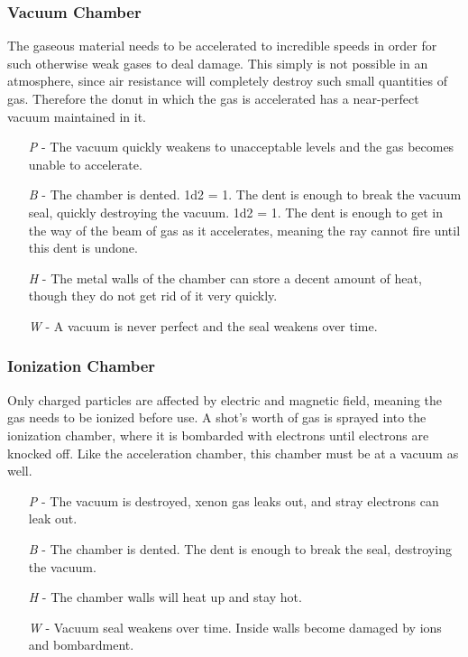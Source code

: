 \documentclass[a4paper]{article}
\begin{document}
\hspace{-18pt} \subsubsection{Vacuum Chamber} \label{ray_chamber} \vspace{-0.2cm}
The gaseous material needs to be accelerated to incredible speeds in order for such otherwise weak gases to deal damage. This simply is not possible in an atmosphere, since air resistance will completely destroy such small quantities of gas. Therefore the donut in which the gas is accelerated has a near-perfect vacuum maintained in it.
\begin{enumerate}
\item [\textit{P}] - The vacuum quickly weakens to unacceptable levels and the gas becomes unable to accelerate.
\item [\textit{B}] - The chamber is dented. \newline \hspace*{3pt} 1d2 = 1. The dent is enough to break the vacuum seal, quickly destroying the vacuum. \newline \hspace*{3pt} 1d2 = 1. The dent is enough to get in the way of the beam of gas as it accelerates, meaning the ray cannot fire until this dent is undone.
\item [\textit{H}] - The metal walls of the chamber can store a decent amount of heat, though they do not get rid of it very quickly.
\item [\textit{W}] - A vacuum is never perfect and the seal weakens over time. 
\end{enumerate}

\vspace{-0.5cm} \hspace{-18pt} \subsubsection{Ionization Chamber} \label{ray_ionization} \vspace{-0.2cm}
Only charged particles are affected by electric and magnetic field, meaning the gas needs to be ionized before use. A shot's worth of gas is sprayed into the ionization chamber, where it is bombarded with electrons until electrons are knocked off. Like the acceleration chamber, this chamber must be at a vacuum as well.
\begin{enumerate}
\item [\textit{P}] - The vacuum is destroyed, xenon gas leaks out, and stray electrons can leak out.
\item [\textit{B}] - The chamber is dented. \newline \hspace*{3pt} The dent is enough to break the seal, destroying the vacuum.
\item [\textit{H}] - The chamber walls will heat up and stay hot.
\item [\textit{W}] - Vacuum seal weakens over time. Inside walls become damaged by ions and bombardment.
\end{enumerate}
\end{document}

